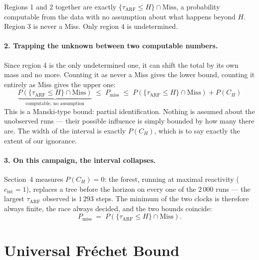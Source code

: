 \documentclass[11pt,a4paper]{article}
\begin{document}
Regions 1 and 2 together are exactly $\{\tau_{\mathrm{ARF}} \le H\} \cap \mathrm{Miss}$, a
probability computable from the data with no assumption about what happens beyond $H$.
Region 3 is never a Miss. Only region 4 is undetermined.

\paragraph{2. Trapping the unknown between two computable numbers.} Since region 4 is the
only undetermined one, it can shift the total by its own mass and no more. Counting it as
never a Miss gives the lower bound, counting it entirely as Miss gives the upper one:
\[
  \underbrace{P(\{\tau_{\mathrm{ARF}}\le H\}\cap\mathrm{Miss})}_{\text{computable, no assumption}}
  \;\le\; P_{\mathrm{miss}} \;\le\;
  P(\{\tau_{\mathrm{ARF}}\le H\}\cap\mathrm{Miss}) + P(C_H)
\]
This is a Manski-type bound: partial identification. Nothing is assumed about the
unobserved runs --- their possible influence is simply bounded by how many there are. The
width of the interval is exactly $P(C_H)$, which is to say exactly the extent of our
ignorance.

\paragraph{3. On this campaign, the interval collapses.} Section~4 measures
$P(C_H) = 0$: the forest, running at maximal reactivity ($c_{\mathrm{int}} = 1$), replaces
a tree before the horizon on every one of the $2\,000$ runs --- the largest
$\tau_{\mathrm{ARF}}$ observed is $1\,293$ steps. The minimum of the two clocks is
therefore always finite, the race always decided, and the two bounds coincide:
\[
  P_{\mathrm{miss}} \;=\; P(\{\tau_{\mathrm{ARF}} \le H\} \cap \mathrm{Miss}).
\]

\begin{center}
\end{center}

\section{Universal Fréchet Bound}
\end{document}
